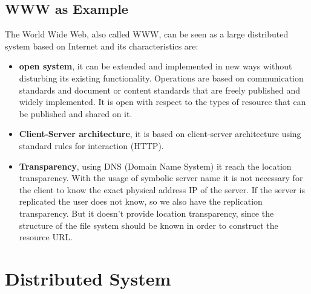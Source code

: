 \documentclass[11pt,a4paper]{article}
\begin{document}
\subsection{WWW as Example}
The World Wide Web, also called WWW, can be seen as a large distributed system based on Internet and its characteristics are:
\begin{itemize}
    \item \textbf{open system}, it can be extended and implemented in new ways without disturbing its existing functionality. Operations are based on communication standards and document or content standards that are freely published and widely implemented. It is open with respect to the types of resource that can be published and shared on it.
    \item \textbf{Client-Server architecture}, it is based on client-server architecture using standard rules for interaction (HTTP).
    \item \textbf{Transparency}, using DNS (Domain Name System) it reach the location transparency. With the usage of symbolic server name it is not necessary for the client to know the exact physical address IP of the server. If the server is replicated the user does not know, so we also have the replication transparency. But it doesn't provide location transparency, since the structure of the file system should be known in order to construct the resource URL.
\end{itemize}

\newpage

\section{Distributed System}
\end{document}
